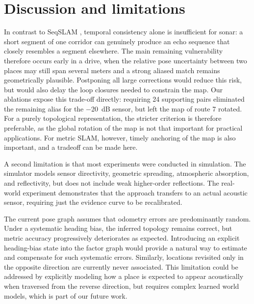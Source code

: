 \section{Discussion and limitations}
\label{sec:limitations}

In contrast to SeqSLAM \cite{milfordSeqSLAMVisualRoutebased2012}, temporal consistency alone is insufficient for sonar: a short segment of one corridor can genuinely produce an echo sequence that closely resembles a segment elsewhere. The main remaining vulnerability therefore occurs early in a drive, when the relative pose uncertainty between two places may still span several meters and a strong aliased match remains geometrically plausible. Postponing all large corrections would reduce this risk, but would also delay the loop closures needed to constrain the map. Our ablations expose this trade-off directly: requiring 24 supporting pairs eliminated the remaining alias for the \SI{-20}{\deci\bel} sensor, but left the map of route 7 rotated. For a purely topological representation, the stricter criterion is therefore preferable, as the global rotation of the map is not that important for practical applications. For metric SLAM, however, timely anchoring of the map is also important, and a tradeoff can be made here.

A second limitation is that most experiments were conducted in simulation. The simulator models sensor directivity, geometric spreading, atmospheric absorption, and reflectivity, but does not include weak higher-order reflections. The real-world experiment demonstrates that the approach transfers to an actual acoustic sensor, requiring just the evidence curve to be recalibrated. 

The current pose graph assumes that odometry errors are predominantly random. Under a systematic heading bias, the inferred topology remains correct, but metric accuracy progressively deteriorates as expected. Introducing an explicit heading-bias state into the factor graph would provide a natural way to estimate and compensate for such systematic errors. Similarly, locations revisited only in the opposite direction are currently never associated. This limitation could be addressed by explicitly modeling how a place is expected to appear acoustically when traversed from the reverse direction, but requires complex learned world models, which is part of our future work.

